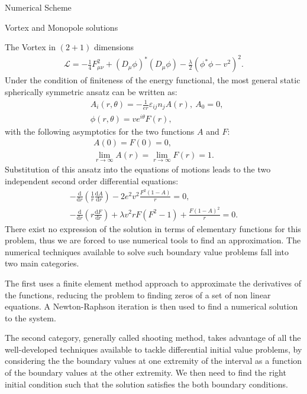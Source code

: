 \begin{section}{Numerical Scheme}
\begin{subsection}{Vortex and Monopole solutions}
\begin{subsubsection}{The Vortex in $(2+1)$ dimensions}
\begin{align}
        \mathcal L = -\frac{1}{4}F^2_{\mu\nu} + (D_\mu\phi)^*(D_\mu\phi)-\frac{\lambda}{2}(\phi^*\phi-v^2)^2.
      \end{align}
      Under the condition of finiteness of the energy functional, the
      most general static spherically symmetric ansatz can be written as:
      \begin{align}
        &A_i(r,\theta) = -\frac{1}{er}\varepsilon_{ij}n_jA(r),\ A_0 = 0,\\
        &\phi(r,\theta) = ve^{i\theta}F(r),
      \end{align}
      with the following asymptotics for the two functions $A$ and $F$:
      \begin{align}
        A(0) = F(0) = 0,\\
        \lim_{r\to\infty}A(r) = \lim_{r\to\infty}F(r) = 1.
      \end{align}
      Substitution of this ansatz into the equations of motions leads
      to the two independent second order differential equations:
      \begin{align}
        -\frac{\mathrm d}{\mathrm d r}\left(\frac{1}{r}\frac{\mathrm d A}{\mathrm d r}\right)-2e^2v^2\frac{F^2(1-A)}{r} = 0,\label{eq:vortex_1}\\
        -\frac{\mathrm d}{\mathrm d r}\left(r\frac{\mathrm d F}{\mathrm d r}\right) + \lambda v^2 r F(F^2-1)+\frac{F(1-A)^2}{r} = 0.\label{eq:vortex_2}
      \end{align}
      There exist no expression of the solution in terms of elementary
      functions for this problem, thus we are forced to use numerical
      tools to find an approximation. The numerical techniques available
      to solve such boundary value problems fall into two main
      categories.
      
      The first uses a finite element method approach to approximate
      the derivatives of the functions, reducing the problem to
      finding zeros of a set of non linear equations.  A
      Newton-Raphson iteration is then used to find a numerical
      solution to the system.
      
      The second category, generally called shooting method, takes
      advantage of all the well-developed techniques available to
      tackle differential initial value problems, by considering the
      the boundary values at one extremity of the interval as a
      function of the boundary values at the other extremity. We then
      need to find the right initial condition such that the solution
      satisfies the both boundary conditions.
      

\end{subsubsection}
\end{subsection}
\end{section}
